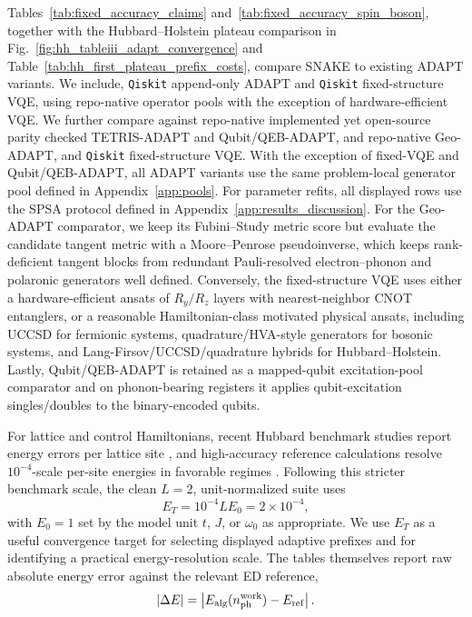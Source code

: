 \documentclass[
  reprint,
  amsmath,
  amssymb,
  aps,
  pra,
  nofootinbib,
  superscriptaddress,
  floatfix
]{revtex4-2}
\begin{document}
Tables~\ref{tab:fixed_accuracy_claims} and~\ref{tab:fixed_accuracy_spin_boson}, together with the Hubbard--Holstein plateau comparison in Fig.~\ref{fig:hh_tableiii_adapt_convergence} and Table~\ref{tab:hh_first_plateau_prefix_costs}, compare SNAKE to existing ADAPT variants. We include, \texttt{Qiskit} append-only ADAPT and \texttt{Qiskit} fixed-structure VQE, using repo-native operator pools with the exception of hardware-efficient VQE. We further compare against repo-native implemented yet open-source parity checked TETRIS-ADAPT and Qubit/QEB-ADAPT, and repo-native Geo-ADAPT, and \texttt{Qiskit} fixed-structure VQE. With the exception of fixed-VQE and Qubit/QEB-ADAPT, all ADAPT variants use the same problem-local
generator pool defined in Appendix~\ref{app:pools}. For parameter refits, all displayed rows use the SPSA protocol defined in Appendix~\ref{app:results_discussion}. For the Geo-ADAPT comparator, we keep its Fubini--Study metric score but evaluate the candidate tangent metric with a Moore--Penrose pseudoinverse, which keeps rank-deficient tangent blocks from redundant Pauli-resolved electron--phonon and polaronic generators well defined. Conversely, the fixed-structure VQE uses either a hardware-efficient ansats of \(R_y/R_z\) layers with nearest-neighbor CNOT entanglers, or a reasonable Hamiltonian-class motivated physical ansats, including UCCSD for fermionic systems, quadrature/HVA-style generators for bosonic
systems, and Lang-Firsov/UCCSD/quadrature hybrids for Hubbard--Holstein.  Lastly, Qubit/QEB-ADAPT is retained as a mapped-qubit excitation-pool comparator and on phonon-bearing
registers it applies qubit-excitation singles/doubles to the
binary-encoded qubits. 

For lattice and control Hamiltonians, recent Hubbard benchmark studies
report energy errors per lattice site \cite{Alvertis2024HubbardVQE},
and high-accuracy reference calculations resolve \(10^{-4}\)-scale
per-site energies in favorable regimes
\cite{LeBlanc2015HubbardBenchmarks,Qin2016AFQMCHubbard}. Following
this stricter benchmark scale, the clean \(L=2\),
unit-normalized suite uses
\[
E_T=10^{-4}LE_0=2\times10^{-4},
\]
with \(E_0=1\) set by the model unit \(t\), \(J\), or \(\omega_0\) as
appropriate.  
We use \(E_T\) as a useful convergence target for selecting displayed adaptive prefixes and for identifying a practical energy-resolution scale. The tables themselves report raw absolute energy error against the relevant ED reference,
\[
|\Delta E|=\left|E_{\rm alg}(n_{\rm ph}^{\rm work})-E_{\rm ref}\right|.
\]
\end{document}
